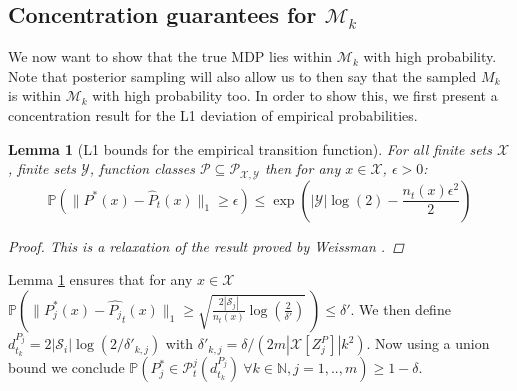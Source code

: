 \documentclass{article}
\newtheorem{lemma}{Lemma}
\newcommand{\Exp}{\mathds{E}}
\newcommand{\Prob}{\mathds{P}}
\newcommand{\Real}{\mathds{R}}
\newcommand{\Nat}{\mathbb{N}}
\newcommand{\Xc}{\mathcal{X}}
\newcommand{\Yc}{\mathcal{Y}}
\newcommand{\Pc}{\mathcal{P}}
\newcommand{\Sc}{\mathcal{S}}
\newcommand{\Mc}{\mathcal{M}}
\begin{document}
\subsection{Concentration guarantees for $\Mc_k$}
We now want to show that the true MDP lies within $\Mc_k$ with high probability.
Note that posterior sampling will also allow us to then say that the sampled $M_k$ is within $\Mc_k$ with high probability too.
In order to show this, we first present a concentration result for the L1 deviation of empirical probabilities.

\begin{lemma}[L1 bounds for the empirical transition function] 
\label{lem: weissman} \hspace{0.000000001mm} \newline
For all finite sets $\Xc$, finite sets $\Yc$, function classes $\Pc \subseteq \Pc_{\Xc,\Yc}$ then for any $x \in \Xc$, $\epsilon > 0$:
\begin{equation*}
	\Prob \left( \| P^*(x) - \hat{P}_t(x) \|_1 \ge \epsilon \right) \le \exp \left( |\Yc| \log(2) - \frac{n_t(x) \epsilon^2}{2} \right)
\end{equation*}
\begin{proof}
This is a relaxation of the result proved by Weissman \cite{weissman2003inequalities}.
\end{proof}
\end{lemma}
Lemma \ref{lem: weissman} ensures that for any $x \in \Xc$
$\Prob \left( \| P_j^*(x) - \hat{P_j}_t(x) \|_{1} \ge \sqrt{\frac{2 | \Sc_j |}{n_t(x)}\log\left( \frac{2}{\delta'} \right)} \ \right) \le \delta'$.
We then define $d^{P_j}_{t_k} = 2 | \Sc_i | \log\left( 2/ \delta'_{k,j} \right)$ with $\delta'_{k,j} = \delta / (2 m | \Xc[Z^P_j] | k^2)$.
Now using a union bound we conclude %
$\Prob \left( P^*_j \in \Pc^j_t(d_{t_k}^{P_j}) \ \forall k \in \Nat,j=1,..,m  \right) \ge 1 - \delta $.

\end{document}
